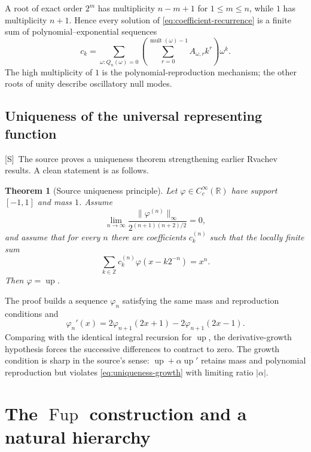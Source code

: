 \documentclass[11pt,oneside]{article}
\newtheorem{theorem}{Theorem}[section]
\theoremstyle{definition}
\theoremstyle{remark}
\newcommand{\R}{\mathbb R}
\newcommand{\Z}{\mathbb Z}
\newcommand{\Up}{\operatorname{up}}
\newcommand{\Smark}{\textcolor{sourceblue}{\textsf{[S]}}}
\begin{document}
A root of exact order $2^m$ has multiplicity $n-m+1$ for $1\le m\le n$, while $1$ has
multiplicity $n+1$.  Hence every solution of \eqref{eq:coefficient-recurrence} is a finite sum
of polynomial--exponential sequences
\begin{equation}
 c_k=\sum_{\omega:Q_n(\omega)=0}
 \left(\sum_{r=0}^{\operatorname{mult}(\omega)-1}A_{\omega,r}k^r\right)\omega^k.
 \label{eq:recurrence-general-solution}
\end{equation}
The high multiplicity of $1$ is the polynomial-reproduction mechanism; the other roots of
unity describe oscillatory null modes.

\subsection{Uniqueness of the universal representing function}

\Smark\ The source proves a uniqueness theorem strengthening earlier Rvachev results.
A clean statement is as follows.

\begin{theorem}[Source uniqueness principle]
\label{thm:source-uniqueness}
Let $\varphi\in C_c^\infty(\R)$ have support $[-1,1]$ and mass $1$.  Assume
\begin{equation}
 \lim_{n\to\infty}
 \frac{\|\varphi^{(n)}\|_\infty}{2^{(n+1)(n+2)/2}}=0,
 \label{eq:uniqueness-growth}
\end{equation}
and assume that for every $n$ there are coefficients $c_k^{(n)}$ such that the locally finite
sum
\begin{equation}
 \sum_{k\in\Z}c_k^{(n)}\varphi(x-k2^{-n})=x^n.
 \label{eq:universal-reproduction}
\end{equation}
Then $\varphi=\Up$.
\end{theorem}

The proof builds a sequence $\varphi_n$ satisfying the same mass and reproduction conditions
and
\begin{equation}
 \varphi_n'(x)=2\varphi_{n+1}(2x+1)-2\varphi_{n+1}(2x-1).
 \label{eq:source-phi-chain}
\end{equation}
Comparing with the identical integral recursion for $\Up$, the derivative-growth hypothesis
forces the successive differences to contract to zero.  The growth condition is sharp in the
source's sense: $\Up+\alpha\Up'$ retains mass and polynomial reproduction but violates
\eqref{eq:uniqueness-growth} with limiting ratio $|\alpha|$.

\section{The $\operatorname{Fup}$ construction and a natural hierarchy}
\label{sec:fup}
\end{document}
